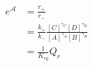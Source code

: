 \begin{eqnarray}\label{eqn:reaction-affinity-ratio}
e^\mathcal{A} &= \frac{r_+}{r_-} \\
& = \frac{k_+}{k_-}\frac{[C]^{\gamma_C}[D]^{\gamma_D}}{[A]^{\gamma_A}[B]^{\gamma_B}} \\
& = \frac{1}{K_{eq}}{Q_r} \\
\end{eqnarray}